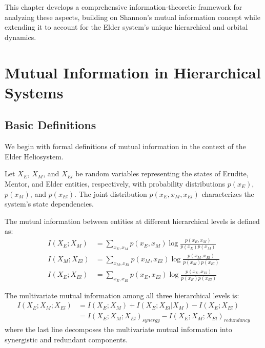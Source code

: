 This chapter develops a comprehensive information-theoretic framework for analyzing these aspects, building on Shannon's mutual information concept while extending it to account for the Elder system's unique hierarchical and orbital dynamics.

\section{Mutual Information in Hierarchical Systems}



\subsection{Basic Definitions}

We begin with formal definitions of mutual information in the context of the Elder Heliosystem.

\begin{definition}
Let $X_E$, $X_M$, and $X_{El}$ be random variables representing the states of Erudite, Mentor, and Elder entities, respectively, with probability distributions $p(x_E)$, $p(x_M)$, and $p(x_{El})$. The joint distribution $p(x_E, x_M, x_{El})$ characterizes the system's state dependencies.
\end{definition}

\begin{definition}
The mutual information between entities at different hierarchical levels is defined as:
\begin{align}
I(X_E; X_M) &= \sum_{x_E, x_M} p(x_E, x_M) \log \frac{p(x_E, x_M)}{p(x_E)p(x_M)} \\
I(X_M; X_{El}) &= \sum_{x_M, x_{El}} p(x_M, x_{El}) \log \frac{p(x_M, x_{El})}{p(x_M)p(x_{El})} \\
I(X_E; X_{El}) &= \sum_{x_E, x_{El}} p(x_E, x_{El}) \log \frac{p(x_E, x_{El})}{p(x_E)p(x_{El})}
\end{align}
\end{definition}

\begin{definition}
The multivariate mutual information among all three hierarchical levels is:
\begin{align}
I(X_E; X_M; X_{El}) &= I(X_E; X_M) + I(X_E; X_{El}|X_M) - I(X_E; X_{El}) \\
&= I(X_E; X_M; X_{El})_{synergy} - I(X_E; X_M; X_{El})_{redundancy}
\end{align}
where the last line decomposes the multivariate mutual information into synergistic and redundant components.
\end{definition}

